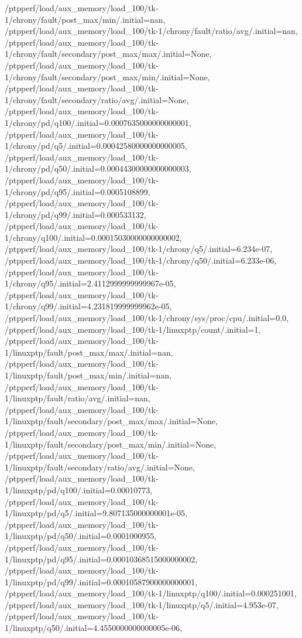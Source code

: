 {    /ptpperf/load/aux_memory/load_100/tk-1/chrony/fault/post_max/min/.initial=nan,
    /ptpperf/load/aux_memory/load_100/tk-1/chrony/fault/ratio/avg/.initial=nan,
    /ptpperf/load/aux_memory/load_100/tk-1/chrony/fault/secondary/post_max/max/.initial=None,
    /ptpperf/load/aux_memory/load_100/tk-1/chrony/fault/secondary/post_max/min/.initial=None,
    /ptpperf/load/aux_memory/load_100/tk-1/chrony/fault/secondary/ratio/avg/.initial=None,
    /ptpperf/load/aux_memory/load_100/tk-1/chrony/pd/q100/.initial=0.0007635000000000001,
    /ptpperf/load/aux_memory/load_100/tk-1/chrony/pd/q5/.initial=0.00042580000000000005,
    /ptpperf/load/aux_memory/load_100/tk-1/chrony/pd/q50/.initial=0.00044300000000000003,
    /ptpperf/load/aux_memory/load_100/tk-1/chrony/pd/q95/.initial=0.0005108899,
    /ptpperf/load/aux_memory/load_100/tk-1/chrony/pd/q99/.initial=0.000533132,
    /ptpperf/load/aux_memory/load_100/tk-1/chrony/q100/.initial=0.00015030000000000002,
    /ptpperf/load/aux_memory/load_100/tk-1/chrony/q5/.initial=6.234e-07,
    /ptpperf/load/aux_memory/load_100/tk-1/chrony/q50/.initial=6.233e-06,
    /ptpperf/load/aux_memory/load_100/tk-1/chrony/q95/.initial=2.4112999999999967e-05,
    /ptpperf/load/aux_memory/load_100/tk-1/chrony/q99/.initial=4.231819999999962e-05,
    /ptpperf/load/aux_memory/load_100/tk-1/chrony/sys/proc/cpu/.initial=0.0,
    /ptpperf/load/aux_memory/load_100/tk-1/linuxptp/count/.initial=1,
    /ptpperf/load/aux_memory/load_100/tk-1/linuxptp/fault/post_max/max/.initial=nan,
    /ptpperf/load/aux_memory/load_100/tk-1/linuxptp/fault/post_max/min/.initial=nan,
    /ptpperf/load/aux_memory/load_100/tk-1/linuxptp/fault/ratio/avg/.initial=nan,
    /ptpperf/load/aux_memory/load_100/tk-1/linuxptp/fault/secondary/post_max/max/.initial=None,
    /ptpperf/load/aux_memory/load_100/tk-1/linuxptp/fault/secondary/post_max/min/.initial=None,
    /ptpperf/load/aux_memory/load_100/tk-1/linuxptp/fault/secondary/ratio/avg/.initial=None,
    /ptpperf/load/aux_memory/load_100/tk-1/linuxptp/pd/q100/.initial=0.00010773,
    /ptpperf/load/aux_memory/load_100/tk-1/linuxptp/pd/q5/.initial=9.807135000000001e-05,
    /ptpperf/load/aux_memory/load_100/tk-1/linuxptp/pd/q50/.initial=0.0001000955,
    /ptpperf/load/aux_memory/load_100/tk-1/linuxptp/pd/q95/.initial=0.00010368515000000002,
    /ptpperf/load/aux_memory/load_100/tk-1/linuxptp/pd/q99/.initial=0.00010587900000000001,
    /ptpperf/load/aux_memory/load_100/tk-1/linuxptp/q100/.initial=0.000251001,
    /ptpperf/load/aux_memory/load_100/tk-1/linuxptp/q5/.initial=4.953e-07,
    /ptpperf/load/aux_memory/load_100/tk-1/linuxptp/q50/.initial=4.4550000000000005e-06,
}

